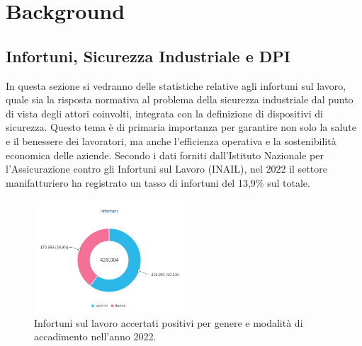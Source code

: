 \chapter{Background}

\section{Infortuni, Sicurezza Industriale e DPI}


In questa sezione si vedranno delle statistiche relative agli infortuni sul lavoro, quale sia la risposta normativa al problema della sicurezza industriale dal punto di vista degli attori coinvolti, integrata con la definizione di dispositivi di sicurezza. Questo tema è di primaria importanza per garantire non solo la salute e il benessere dei lavoratori, ma anche l'efficienza operativa e la sostenibilità economica delle aziende. Secondo i dati forniti dall'Istituto Nazionale per l'Assicurazione contro gli Infortuni sul Lavoro (INAIL), nel 2022 il settore manifatturiero ha registrato un tasso di infortuni del 13,9\% sul totale\cite{b1inail2023}.

\begin{figure}[htbp]
    \centering
    \includegraphics[width=0.5\textwidth]{figures/totaleinfortuni.png}
    \caption{Infortuni sul lavoro accertati positivi per genere
e modalità di accadimento nell'anno 2022.}
    \label{fig:infortot}
\end{figure}

